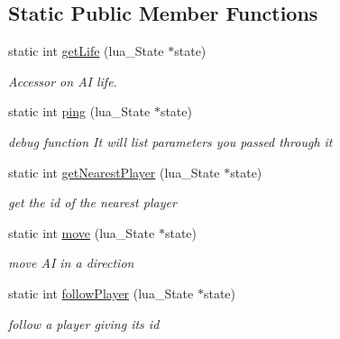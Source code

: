 \subsection*{Static Public Member Functions}
\begin{DoxyCompactItemize}
\item 
\mbox{\label{classIA_a1d8f2d91effd6eab9610763bb324d8cd}} 
static int \hyperlink{classIA_a1d8f2d91effd6eab9610763bb324d8cd}{get\+Life} (lua\+\_\+\+State $\ast$state)
\begin{DoxyCompactList}\small\item\em Accessor on AI life. \end{DoxyCompactList}\item 
\mbox{\label{classIA_af8df32744539390d12d6748f0edf0311}} 
static int \hyperlink{classIA_af8df32744539390d12d6748f0edf0311}{ping} (lua\+\_\+\+State $\ast$state)
\begin{DoxyCompactList}\small\item\em debug function It will list parameters you passed through it \end{DoxyCompactList}\item 
\mbox{\label{classIA_a2ed64a5d1cf26fba609bf2208622957c}} 
static int \hyperlink{classIA_a2ed64a5d1cf26fba609bf2208622957c}{get\+Nearest\+Player} (lua\+\_\+\+State $\ast$state)
\begin{DoxyCompactList}\small\item\em get the id of the nearest player \end{DoxyCompactList}\item 
\mbox{\label{classIA_a23d578bd33cd4260b9381116d5979c2e}} 
static int \hyperlink{classIA_a23d578bd33cd4260b9381116d5979c2e}{move} (lua\+\_\+\+State $\ast$state)
\begin{DoxyCompactList}\small\item\em move AI in a direction \end{DoxyCompactList}\item 
\mbox{\label{classIA_a7b69140525af0e287742977cd803927f}} 
static int \hyperlink{classIA_a7b69140525af0e287742977cd803927f}{follow\+Player} (lua\+\_\+\+State $\ast$state)
\begin{DoxyCompactList}\small\item\em follow a player giving its id \end{DoxyCompactList}\item 

\end{DoxyCompactItemize}
